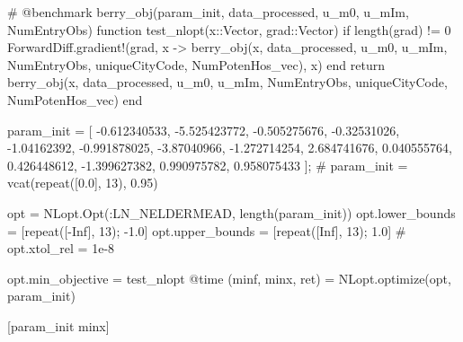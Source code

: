\documentclass[
  letterpaper,
  DIV=11,
  numbers=noendperiod]{scrreprt}
\newenvironment{Shaded}{\begin{snugshade}}{\end{snugshade}}
\newcommand{\CommentTok}[1]{\textcolor[rgb]{0.37,0.37,0.37}{#1}}
\newcommand{\ConstantTok}[1]{\textcolor[rgb]{0.56,0.35,0.01}{#1}}
\newcommand{\ControlFlowTok}[1]{\textcolor[rgb]{0.00,0.23,0.31}{#1}}
\newcommand{\DataTypeTok}[1]{\textcolor[rgb]{0.68,0.00,0.00}{#1}}
\newcommand{\FloatTok}[1]{\textcolor[rgb]{0.68,0.00,0.00}{#1}}
\newcommand{\FunctionTok}[1]{\textcolor[rgb]{0.28,0.35,0.67}{#1}}
\newcommand{\KeywordTok}[1]{\textcolor[rgb]{0.00,0.23,0.31}{#1}}
\newcommand{\NormalTok}[1]{\textcolor[rgb]{0.00,0.23,0.31}{#1}}
\newcommand{\OperatorTok}[1]{\textcolor[rgb]{0.37,0.37,0.37}{#1}}
\newcommand{\PreprocessorTok}[1]{\textcolor[rgb]{0.68,0.00,0.00}{#1}}
\begin{document}
\begin{Shaded}
\begin{Highlighting}[]
\CommentTok{\# @benchmark berry\_obj(param\_init, data\_processed, u\_m0, u\_mIm, NumEntryObs)}
\KeywordTok{function} \FunctionTok{test\_nlopt}\NormalTok{(x}\OperatorTok{::}\DataTypeTok{Vector}\NormalTok{, grad}\OperatorTok{::}\DataTypeTok{Vector}\NormalTok{)}
    \ControlFlowTok{if} \FunctionTok{length}\NormalTok{(grad) }\OperatorTok{!=} \FloatTok{0}
\NormalTok{        ForwardDiff.}\FunctionTok{gradient!}\NormalTok{(grad, x }\OperatorTok{{-}\textgreater{}} \FunctionTok{berry\_obj}\NormalTok{(x, data\_processed, u\_m0, u\_mIm, NumEntryObs, uniqueCityCode, NumPotenHos\_vec), x)}
    \ControlFlowTok{end}
    \ControlFlowTok{return} \FunctionTok{berry\_obj}\NormalTok{(x, data\_processed, u\_m0, u\_mIm, NumEntryObs, uniqueCityCode, NumPotenHos\_vec)}
\KeywordTok{end}

\NormalTok{param\_init }\OperatorTok{=}\NormalTok{ [}
    \OperatorTok{{-}}\FloatTok{0.612340533}\NormalTok{,   }\OperatorTok{{-}}\FloatTok{5.525423772}\NormalTok{,   }\OperatorTok{{-}}\FloatTok{0.505275676}\NormalTok{,   }
    \OperatorTok{{-}}\FloatTok{0.32531026}\NormalTok{,    }\OperatorTok{{-}}\FloatTok{1.04162392}\NormalTok{,    }\OperatorTok{{-}}\FloatTok{0.991878025}\NormalTok{,   }
    \OperatorTok{{-}}\FloatTok{3.87040966}\NormalTok{,    }\OperatorTok{{-}}\FloatTok{1.272714254}\NormalTok{,   }\FloatTok{2.684741676}\NormalTok{,    }
    \FloatTok{0.040555764}\NormalTok{,    }\FloatTok{0.426448612}\NormalTok{,    }\OperatorTok{{-}}\FloatTok{1.399627382}\NormalTok{,   }
    \FloatTok{0.990975782}\NormalTok{,    }\FloatTok{0.958075433}
\NormalTok{];}
\CommentTok{\# param\_init = vcat(repeat([0.0], 13), 0.95)}

\NormalTok{opt }\OperatorTok{=}\NormalTok{ NLopt.}\FunctionTok{Opt}\NormalTok{(}\OperatorTok{:}\NormalTok{LN\_NELDERMEAD, }\FunctionTok{length}\NormalTok{(param\_init))}
\NormalTok{opt.lower\_bounds }\OperatorTok{=}\NormalTok{ [}\FunctionTok{repeat}\NormalTok{([}\OperatorTok{{-}}\ConstantTok{Inf}\NormalTok{], }\FloatTok{13}\NormalTok{); }\OperatorTok{{-}}\FloatTok{1.0}\NormalTok{]}
\NormalTok{opt.upper\_bounds }\OperatorTok{=}\NormalTok{ [}\FunctionTok{repeat}\NormalTok{([}\ConstantTok{Inf}\NormalTok{], }\FloatTok{13}\NormalTok{); }\FloatTok{1.0}\NormalTok{]}
\CommentTok{\# opt.xtol\_rel = 1e{-}8}

\NormalTok{opt.min\_objective }\OperatorTok{=}\NormalTok{ test\_nlopt}
\PreprocessorTok{@time}\NormalTok{ (minf, minx, ret) }\OperatorTok{=}\NormalTok{ NLopt.}\FunctionTok{optimize}\NormalTok{(opt, param\_init)}

\NormalTok{[param\_init minx]}
\end{Highlighting}
\end{Shaded}
\end{document}
